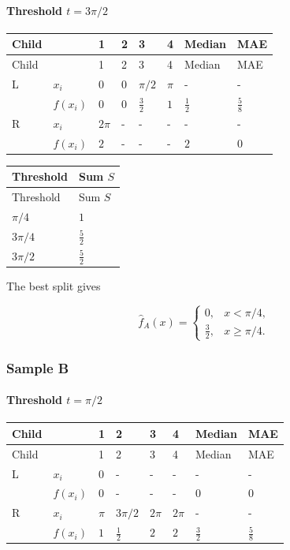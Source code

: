 \documentclass[10pt]{article}
\begin{document}
\paragraph*{Threshold $t=3\pi/2$}
\begingroup
\small
\setlength{\tabcolsep}{4pt}
\begin{longtable}{l|l|l|l|l|l|l|l}
Child &  & 1 & 2 & 3 & 4 & Median & MAE \\
\hline
\endfirsthead
Child &  & 1 & 2 & 3 & 4 & Median & MAE \\
\hline
\endhead
L & $x_i$ & $0$ & $0$ & $\pi/2$ & $\pi$ & - & - \\[3pt]
 & $f(x_i)$ & $0$ & $0$ & $\frac{3}{2}$ & $1$ & $\frac{1}{2}$ & $\frac{5}{8}$ \\[3pt]
R & $x_i$ & $2\pi$ & - & - & - & - & - \\[3pt]
 & $f(x_i)$ & $2$ & - & - & - & $2$ & $0$ \\[3pt]
\end{longtable}
\endgroup
\begingroup
\small
\setlength{\tabcolsep}{4pt}
\begin{longtable}{l|l}
Threshold & Sum $S$ \\
\hline
\endfirsthead
Threshold & Sum $S$ \\
\hline
\endhead
$\pi/4$ & $1$ \\[1.5pt]
$3\pi/4$ & $\frac{5}{2}$ \\[1.5pt]
$3\pi/2$ & $\frac{5}{2}$ \\[1.5pt]
\end{longtable}
\endgroup
The best split gives

\[
\hat f_A(x)=\begin{cases}0,&x<\pi/4,\\\frac{3}{2},&x\geq \pi/4.\end{cases}
\]

\subsubsection*{Sample B}
\paragraph*{Threshold $t=\pi/2$}
\begingroup
\small
\setlength{\tabcolsep}{4pt}
\begin{longtable}{l|l|l|l|l|l|l|l}
Child &  & 1 & 2 & 3 & 4 & Median & MAE \\
\hline
\endfirsthead
Child &  & 1 & 2 & 3 & 4 & Median & MAE \\
\hline
\endhead
L & $x_i$ & $0$ & - & - & - & - & - \\[3pt]
 & $f(x_i)$ & $0$ & - & - & - & $0$ & $0$ \\[3pt]
R & $x_i$ & $\pi$ & $3\pi/2$ & $2\pi$ & $2\pi$ & - & - \\[3pt]
 & $f(x_i)$ & $1$ & $\frac{1}{2}$ & $2$ & $2$ & $\frac{3}{2}$ & $\frac{5}{8}$ \\[3pt]
\end{longtable}
\endgroup
\end{document}
